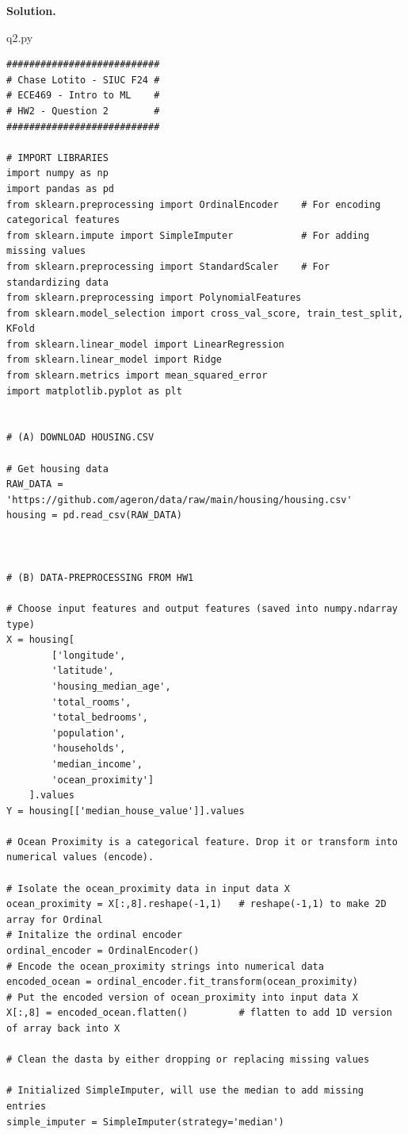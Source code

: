 \documentclass[11pt]{article}
\begin{document}
\textbf{Solution.}
\begin{center}
  q2.py
\end{center}
\begin{lstlisting}
###########################
# Chase Lotito - SIUC F24 #
# ECE469 - Intro to ML    #
# HW2 - Question 2        #
###########################

# IMPORT LIBRARIES
import numpy as np
import pandas as pd
from sklearn.preprocessing import OrdinalEncoder    # For encoding categorical features
from sklearn.impute import SimpleImputer            # For adding missing values
from sklearn.preprocessing import StandardScaler    # For standardizing data
from sklearn.preprocessing import PolynomialFeatures
from sklearn.model_selection import cross_val_score, train_test_split, KFold
from sklearn.linear_model import LinearRegression
from sklearn.linear_model import Ridge
from sklearn.metrics import mean_squared_error
import matplotlib.pyplot as plt


# (A) DOWNLOAD HOUSING.CSV

# Get housing data
RAW_DATA = 'https://github.com/ageron/data/raw/main/housing/housing.csv'
housing = pd.read_csv(RAW_DATA)



# (B) DATA-PREPROCESSING FROM HW1

# Choose input features and output features (saved into numpy.ndarray type)
X = housing[
        ['longitude',
        'latitude',
        'housing_median_age',
        'total_rooms',
        'total_bedrooms',
        'population',
        'households',
        'median_income',
        'ocean_proximity']
    ].values
Y = housing[['median_house_value']].values

# Ocean Proximity is a categorical feature. Drop it or transform into numerical values (encode).

# Isolate the ocean_proximity data in input data X
ocean_proximity = X[:,8].reshape(-1,1)   # reshape(-1,1) to make 2D array for Ordinal
# Initalize the ordinal encoder
ordinal_encoder = OrdinalEncoder()
# Encode the ocean_proximity strings into numerical data
encoded_ocean = ordinal_encoder.fit_transform(ocean_proximity)
# Put the encoded version of ocean_proximity into input data X
X[:,8] = encoded_ocean.flatten()         # flatten to add 1D version of array back into X

# Clean the dasta by either dropping or replacing missing values

# Initialized SimpleImputer, will use the median to add missing entries
simple_imputer = SimpleImputer(strategy='median')


\end{lstlisting}
\end{document}
